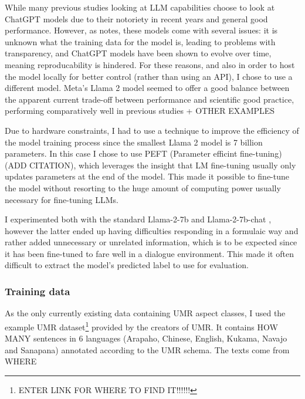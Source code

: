 While many previous studies looking at LLM capabilities choose to look at ChatGPT models due to their notoriety in recent years and general good performance. However, as \citet{törnberg2024best} notes, these models come with several issues: it is unknown what the training data for the model is, leading to problems with transparency, and ChatGPT models have been shown to evolve over time, meaning reproducability is hindered. For these reasons, and also in order to host the model locally for better control (rather than using an API), I chose to use a different model. Meta's Llama 2 model seemed to offer a good balance between the apparent current trade-off between performance and scientific good practice, performing comparatively well in previous studies \citep{yuan2023futureTimeLlama} + OTHER EXAMPLES

Due to hardware constraints, I had to use a technique to improve the efficiency of the model training process since the smallest Llama 2 model is 7 billion parameters. In this case I chose to use PEFT (Parameter efficint fine-tuning) (ADD CITATION), which leverages the insight that LM fine-tuning usually only updates parameters at the end of the model. This made it possible to fine-tune the model without resorting to the huge amount of computing power usually necessary for fine-tuning LLMs.

I experimented both with the standard \textsf{Llama-2-7b} and \textsf{Llama-2-7b-chat} \citep{touvron2023llama}, however the latter ended up having difficulties responding in a formulaic way and rather added unnecessary or unrelated information, which is to be expected since it has been fine-tuned to fare well in a dialogue environment. This made it often difficult to extract the model's predicted label to use for evaluation. 

\subsubsection*{Training data}
As the only currently existing data containing UMR aspect classes, I used the example UMR dataset\footnote{ENTER LINK FOR WHERE TO FIND IT!!!!!!} provided by the creators of UMR. It contains HOW MANY sentences in 6 languages (Arapaho, Chinese, English, Kukama, Navajo and Sanapana) annotated according to the UMR schema. The texts come from WHERE 

